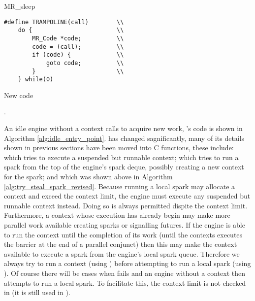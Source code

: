 \begin{algorithm}
\begin{multicols}{2}

\parbox{\textwidth}{
\begin{algorithmic}
        \State {}
        \State {}
        \State {}
        \Goto MR\_sleep
    \EndProcedure
\end{algorithmic}
}

\begin{minipage}{\textwidth}
\begin{verbatim}
#define TRAMPOLINE(call)        \\
    do {                        \\
        MR_Code *code;          \\
        code = (call);          \\
        if (code) {             \\
            goto code;          \\
        }                       \\
    } while(0)
\end{verbatim}
\end{minipage}

\end{multicols}
\caption{New \idle code}
\label{alg:idle_entry_point}
\end{algorithm}

.

An idle engine without a context calls \idle to acquire new work,
\idle's code is shown in Algorithm \ref{alg:idle_entry_point}.
\idle has changed sagnificantly,
many of its details shown in previous sections have been moved into C
functions,
these include:
\tryruncontext which tries to execute a suspended but runnable context;
\tryrunlocalspark which tries to run a spark from the top of the engine's
spark deque, possibly creating a new context for the spark;
and 
\trystealspark which was shown above in Algorithm
\ref{alg:try_steal_spark_revised}.
Because running a local spark may allocate a context and exceed the context
limit,
the engine must execute any suspended but runnable context instead.
Doing so is always permitted dispite the context limit.
Furthermore,
a context whose execution has already begin may make more parallel work
available creating sparks or signalling futures.
If the engine is able to run the context until the completion of its work
(until the contexts executes the \joinandcontinue barrier at the end of a
parallel conjunct)
then this may make the context available to execute a spark from the
engine's local spark queue.
Therefore we always try to run a context (using \tryruncontext)
before attempting to run a local spark (using \tryrunlocalspark).
Of course there will be cases when \tryruncontext fails and an engine
without a context then attempts to run a local spark.
To facilitate this, the context limit is not checked in \tryrunlocalspark
(it is still used in \trystealspark).

